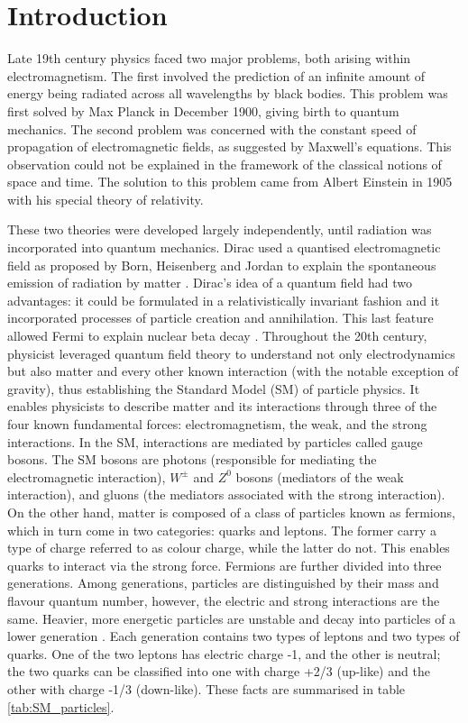 \chapter{Introduction}
\label{ch:introduction}
\label{ch:chapter1}

Late 19th century physics faced two major problems, both arising within electromagnetism. The first involved the prediction of an infinite amount of energy being radiated across all wavelengths by black bodies. This problem was first solved by Max Planck in December 1900, giving birth to quantum mechanics. The second problem was concerned with the constant speed of propagation of electromagnetic fields, as suggested by Maxwell's equations. This observation could not be explained in the framework of the classical notions of space and time. The solution to this problem came from Albert Einstein in 1905 with his special theory of relativity.

These two theories were developed largely independently, until radiation was incorporated into quantum mechanics. Dirac used a quantised electromagnetic field as proposed by Born, Heisenberg and Jordan to explain the spontaneous emission of radiation by matter \cite{weinberg_search_1977}. Dirac's idea of a quantum field had two advantages: it could be formulated in a relativistically invariant fashion and it incorporated processes of particle creation and annihilation. This last feature allowed Fermi to explain nuclear beta decay \cite{weinberg_search_1977}. Throughout the 20th century, physicist leveraged quantum field theory to understand not only electrodynamics but also matter and every other known interaction (with the notable exception of gravity), thus establishing the Standard Model (SM) of particle physics. It enables physicists to describe matter and its interactions through three of the four known fundamental forces: electromagnetism, the weak, and the strong interactions. In the SM, interactions are mediated by particles called gauge bosons. The SM bosons are photons (responsible for mediating the electromagnetic interaction), $W^{\pm}$ and $Z^0$ bosons (mediators of the weak interaction), and gluons (the mediators associated with the strong interaction). On the other hand, matter is composed of a class of particles known as fermions, which in turn come in two categories: quarks and leptons. The former carry a type of charge referred to as colour charge, while the latter do not. This enables quarks to interact via the strong force. Fermions are further divided into three generations. Among generations, particles are distinguished by their mass and flavour quantum number, however, the electric and strong interactions are the same. Heavier, more energetic particles are unstable and decay into particles of a lower generation \cite{kane_modern_1987}. Each generation contains two types of leptons and two types of quarks. One of the two leptons has electric charge -1, and the other is neutral; the two quarks can be classified into one with charge +2/3 (up-like) and the other with charge -1/3 (down-like). These facts are summarised in table \ref{tab:SM_particles}.


